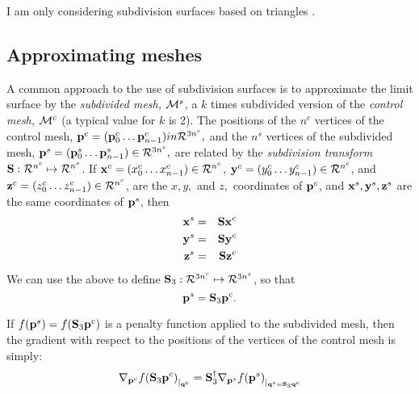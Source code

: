 I am only considering subdivision surfaces based on triangles
\cite{hoppe-et-al-94,hoppe-thesis-94}.

\subsection{Approximating meshes}
\label{sec:Approximating-meshes}

A common approach to the use of subdivision surfaces is
to approximate the limit surface by the {\it subdivided mesh,} $\M^s$,
a $k$ times subdivided version of the {\it control mesh,} $\M^c$
(a typical value for $k$ is 2).
The positions of the $n^c$ vertices of the control mesh,
$\p^c = (\p^c_0 \ldots \p^c_{n-1}) \\in \Re^{3n^c},$
and the $n^s$ vertices of the subdivided mesh,
$\p^s = (\p^s_0 \ldots \p^s_{n-1}) \in \Re^{3n^s},$
are related by the {\it subdivision transform}
$\S : \Re^{n^c} \mapsto \Re^{n^s}$.
If
$\x^c = (x^c_0 \ldots x^c_{n-1}) \in \Re^{n^c}$,
$\y^c = (y^c_0 \ldots y^c_{n-1}) \in \Re^{n^c}$,
and
$\z^c = (z^c_0 \ldots z^c_{n-1}) \in \Re^{n^c}$,
are the $x, y,$ and $z,$ coordinates of $\p^c$,
and $\x^s, \y^s, \z^s$ are the same coordinates
of $\p^s$, then
\begin{eqnarray}
\x^s & = & \S \x^c
\\
\y^s & = & \S \y^c
\nonumber
\\
\z^s & = & \S \z^c
\nonumber
\end{eqnarray}
We can use the above to define $\S_3 : \Re^{3n^c} \mapsto \Re^{3n^s}$,
so that
\begin{equation}
\p^s = \S_3 \p^c.
\end{equation}


If $f(\p^s) = f(\S_3 \p^c)$ is a penalty function applied to the subdivided mesh,
then the gradient with respect to the positions of
the vertices of the control mesh is simply:
\begin{equation}
\Gc{\p^c}{f(\S_3 \p^c)}{\q^c} = \S_3^{\dagger} \Gc{\p^s}{f(\p^s)}{\q^s = \S_3 \q^c}
\end{equation}
